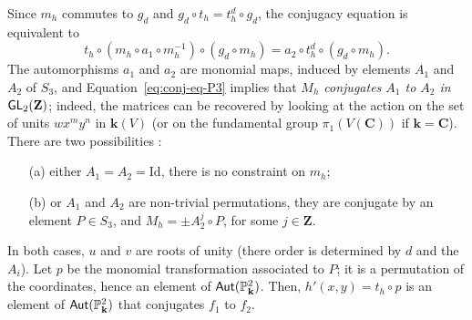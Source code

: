 \documentclass[reqno,oneside,12pt]{amsart}
\theoremstyle{plain}
\newtheorem{lem}[thm]{Lemma}
\theoremstyle{definition}
\def\C{\mathbf{C}}
\def\Z{\mathbf{Z}}
\def\bfk{{\mathbf{k}}}
\def\bfF{{\mathbf{F}}}
\def\P{\mathbb{P}}
\def\Aut{{\sf{Aut}}}
\def\GL{{\sf{GL}}}
\begin{document}
{{{{Since $m_h$ commutes to $g_d$ and $g_d \circ t_h=t_h^d\circ g_d$,  the conjugacy equation is equivalent to 
\begin{equation}\label{eq:conj-eq-P3}
t_h\circ (m_h\circ a_1\circ m_h^{-1})\circ (g_d\circ m_h)= a_2\circ t_h^d\circ (g_d\circ m_h).
\end{equation}
The automorphisms $a_1$ and $a_2$ are monomial maps, induced by elements $A_1$ and $A_2$ of $S_3$, 
and Equation~\eqref{eq:conj-eq-P3} implies that {\sl{$M_h$ conjugates $A_1$ to $A_2$ in $\GL_2(\Z)$}}; indeed, 
the matrices can be recovered by looking at the action on the set of units $wx^m y^n$ in $\bfk(V)$ (or on the fundamental group 
$\pi_1(V(\C))$ if $\bfk=\C$). There are two possibilities : 
\begin{itemize}
\item[(a)] either $A_1=A_2=\mathrm{Id}$, there is no constraint on $m_h$;
\item[(b)] or $A_1$ and $A_2$ are non-trivial permutations, they are conjugate by an element $P\in S_3$,  and 
$M_h=\pm A_2^j \circ P$, for some $j\in \Z$. 
\end{itemize}
In both cases, $u$ and $v$ are roots of unity (there order is determined by $d$ and the $A_i$).
Let $p$ be the monomial transformation associated to $P$; it is a permutation of the coordinates, 
hence an element of $\Aut(\P^2_\bfk)$. Then, $h'(x,y)=t_h\circ p$ is an element of $\Aut(\P^2_\bfk)$ 
that conjugates $f_1$ to $f_2$. 
%
%
%

 


\medskip

%
%
%
%
%
%
%
%
%
%
%
%
%
%
%
%

}}}}
\end{document}
